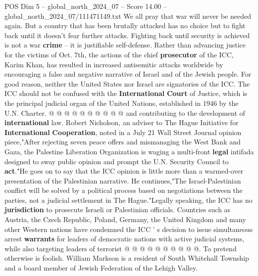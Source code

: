 \begin{textsample}{POS Dim 5 – global\_north\_2024\_07 – Score 14.00 – global\_north\_2024\_07/111471149.txt}
We all pray that war will never be needed again.
But a country that has been brutally attacked has no choice but to fight back until it doesn't fear further attacks.
Fighting back until security is achieved is not a war \textbf{crime} -- it is justifiable self-defense.
Rather than advancing justice for the victims of Oct. 7th, the actions of the chief \textbf{prosecutor} of the ICC, Karim Khan, has resulted in increased antisemitic attacks worldwide by encouraging a false and negative narrative of Israel and of the Jewish people.
For good reason, neither the United States nor Israel are signatories of the ICC.
The ICC should not be confused with the \textbf{International} \textbf{Court} of Justice, which is the principal judicial organ of the United Nations, established in 1946 by the U.N.
Charter. @ @ @ @ @ @ @ @ @ @ and contributing to the development of \textbf{international} law.
Robert Nicholson, an adviser to The Hague Initiative for \textbf{International} \textbf{Cooperation}, noted in a July 21 Wall Street Journal opinion piece,"After rejecting seven peace offers and mismanaging the West Bank and Gaza, the Palestine Liberation Organization is waging a multi-front \textbf{legal} intifada designed to sway public opinion and prompt the U.N.
Security Council to \textbf{act}."He goes on to say that the ICC opinion is little more than a warmed-over presentation of the Palestinian narrative.
He continues,"The Israel-Palestinian conflict will be solved by a political process based on negotiations between the parties, not a judicial settlement in The Hague."Legally speaking, the ICC has no \textbf{jurisdiction} to prosecute Israeli or Palestinian officials.
Countries such as Austria, the Czech Republic, Poland, Germany, the United Kingdom and many other Western nations have condemned the ICC ' s decision to issue simultaneous arrest \textbf{warrants} for leaders of democratic nations with active judicial systems, while also targeting leaders of terrorist @ @ @ @ @ @ @ @ @ @.
To pretend otherwise is foolish.
William Markson is a resident of South Whitehall Township and a board member of Jewish Federation of the Lehigh Valley.

\end{textsample}

